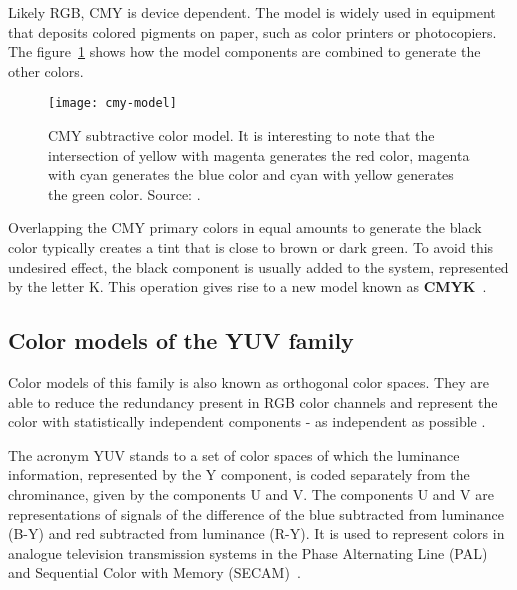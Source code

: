 Likely RGB, CMY is device dependent. The model is widely used in equipment that deposits colored pigments on paper, such as color printers or photocopiers. The figure~\ref{fig:cmy-model} shows how the model components are combined to generate the other colors.

\begin{figure}[!h]
  \centering
  \texttt{[image: cmy-model]}
  \caption[CMY subtractive color model]{CMY subtractive color model. It is interesting to note that the intersection of yellow with magenta generates the red color, magenta with cyan generates the blue color and cyan with yellow generates the green color. Source: \citet{rus:08}.}
  \label{fig:cmy-model}
\end{figure}

Overlapping the CMY primary colors in equal amounts to generate the black color typically creates a tint that is close to brown or dark green. To avoid this undesired effect, the black component is usually added to the system, represented by the letter K. This operation gives rise to a new model known as \textbf{CMYK}~\citep{gonzalez:02}.

\subsection{Color models of the YUV family}
\label{sec:modelo_cores_yuv}

Color models of this family is also known as orthogonal color spaces. They are able to reduce the redundancy present in RGB color channels and represent the color with statistically independent components - as independent as possible \citep{kakumanu:07}.

The acronym YUV stands to a set of color spaces of which the luminance information, represented by the Y component, is coded separately from the chrominance, given by the components U and V. The components U and V are representations of signals of the difference of the blue subtracted from luminance (B-Y) and red subtracted from luminance (R-Y). It is used to represent colors in analogue television transmission systems in the Phase Alternating Line (PAL) and Sequential Color with Memory (SECAM)~\citep{pedrini:08}.

